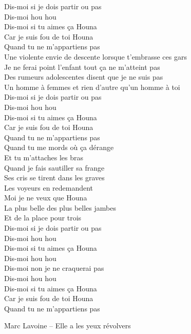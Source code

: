 \documentclass{novel}
\begin{document}
Dis-moi si je dois partir ou pas \\
Dis-moi hou hou \\
Dis-moi si tu aimes ça Houna \\
Car je suis fou de toi Houna \\
Quand tu ne m'appartiens pas \\

Une violente envie de descente lorsque t'embrasse ces gars \\
Je ne ferai point l'enfant tout ça ne m'atteint pas \\
Des rumeurs adolescentes disent que je ne suis pas \\
Un homme à femmes et rien d'autre qu'un homme à toi \\

Dis-moi si je dois partir ou pas \\
Dis-moi hou hou \\
Dis-moi si tu aimes ça Houna \\
Car je suis fou de toi Houna \\
Quand tu ne m'appartiens pas \\

Quand tu me mords où ça dérange \\
Et tu m'attaches les bras \\
Quand je fais sautiller sa frange \\
Ses cris se tirent dans les graves \\
Les voyeurs en redemandent \\
Moi je ne veux que Houna \\
La plus belle des plus belles jambes \\
Et de la place pour trois \\

Dis-moi si je dois partir ou pas \\
Dis-moi hou hou \\
Dis-moi si tu aimes ça Houna \\
Dis-moi hou hou \\
Dis-moi non je ne craquerai pas \\
Dis-moi hou hou \\
Dis-moi si tu aimes ça Houna \\
Car je suis fou de toi Houna \\
Quand tu ne m'appartiens pas

\newpage
\normalsize
\h*{Marc Lavoine – Elle a les yeux révolvers}
\end{document}
